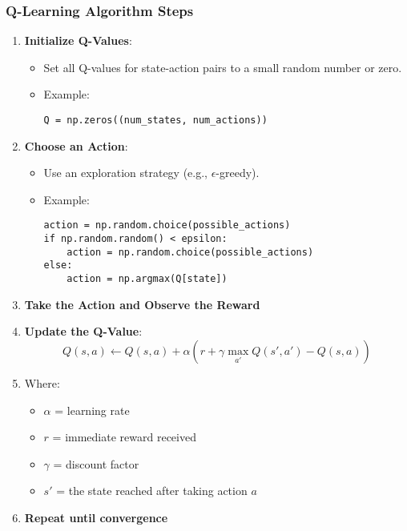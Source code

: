 \documentclass[aspectratio=169]{beamer}
\begin{document}
\begin{frame}[fragile]
    \frametitle{Q-Learning Algorithm Steps}
    \begin{enumerate}
        \item \textbf{Initialize Q-Values}:
            \begin{itemize}
                \item Set all Q-values for state-action pairs to a small random number or zero.
                \item Example: 
                \begin{lstlisting}
Q = np.zeros((num_states, num_actions))
                \end{lstlisting}
            \end{itemize}
        \item \textbf{Choose an Action}:
            \begin{itemize}
                \item Use an exploration strategy (e.g., $\epsilon$-greedy).
                \item Example: 
                \begin{lstlisting}
action = np.random.choice(possible_actions) 
if np.random.random() < epsilon:
    action = np.random.choice(possible_actions)
else:
    action = np.argmax(Q[state])
                \end{lstlisting}
            \end{itemize}
        \item \textbf{Take the Action and Observe the Reward}
        \item \textbf{Update the Q-Value}:
            \begin{equation}
            Q(s, a) \leftarrow Q(s, a) + \alpha \left( r + \gamma \max_{a'} Q(s', a') - Q(s, a) \right)
            \end{equation}
            \item Where:
            \begin{itemize}
                \item $\alpha$ = learning rate
                \item $r$ = immediate reward received
                \item $\gamma$ = discount factor
                \item $s'$ = the state reached after taking action $a$
            \end{itemize}
        \item \textbf{Repeat until convergence}
    \end{enumerate}
\end{frame}
\end{document}
